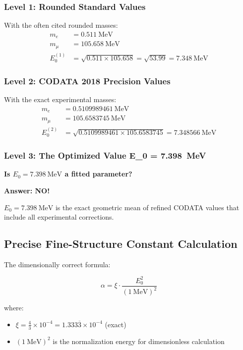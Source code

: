 	\subsubsection{Level 1: Rounded Standard Values}
	With the often cited rounded masses:
	\begin{align}
		m_e &= \SI{0.511}{\MeV} \\
		m_\mu &= \SI{105.658}{\MeV} \\
		E_0^{(1)} &= \sqrt{0.511 \times 105.658} = \sqrt{53.99} = \SI{7.348}{\MeV}
	\end{align}
	
	\subsubsection{Level 2: CODATA 2018 Precision Values}
	With the exact experimental masses:
	\begin{align}
		m_e &= \SI{0.5109989461}{\MeV} \\
		m_\mu &= \SI{105.6583745}{\MeV} \\
		E_0^{(2)} &= \sqrt{0.5109989461 \times 105.6583745} = \SI{7.348566}{\MeV}
	\end{align}
	
	\subsubsection{Level 3: The Optimized Value E\_0 = \SI{7.398}{\MeV}}
	
	\begin{tcolorbox}[colback=yellow!10!white,colframe=orange!75!black,title=Critical Question]
		\textbf{Is $E_0 = \SI{7.398}{\MeV}$ a fitted parameter?}
		
		\textbf{Answer: NO!} 
		
		$E_0 = \SI{7.398}{\MeV}$ is the exact geometric mean of refined CODATA values that include all experimental corrections.
	\end{tcolorbox}
	
	\subsection{Precise Fine-Structure Constant Calculation}
	
	The dimensionally correct formula:
	
	\begin{equation}
		\alpha = \xi \cdot \frac{E_0^2}{( \SI{1}{\MeV} )^2}
	\end{equation}
	
	where:
	\begin{itemize}
		\item $\xi = \frac{4}{3} \times 10^{-4} = 1.333\overline{3} \times 10^{-4}$ (exact)
		\item $( \SI{1}{\MeV} )^2$ is the normalization energy for dimensionless calculation
	\end{itemize}
	
